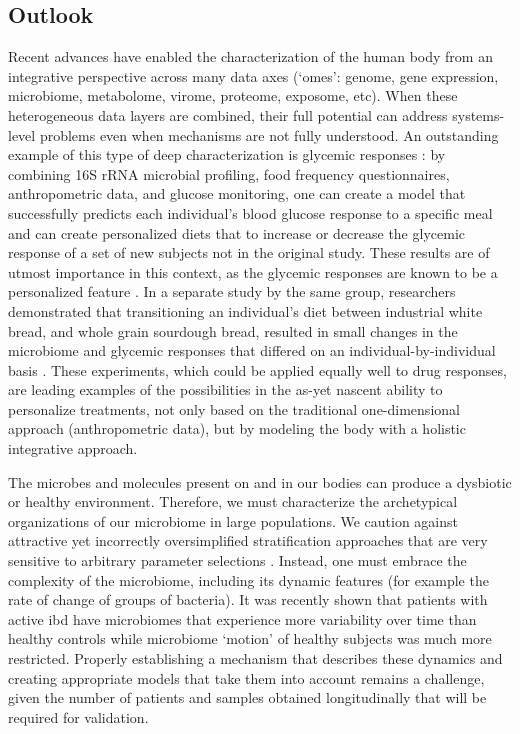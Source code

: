 \subsection{Outlook}
Recent advances have enabled the characterization of the human body from an integrative perspective across many data axes (`omes': genome, gene expression, microbiome, metabolome, virome, proteome, exposome, etc). When these heterogeneous data layers are combined, their full potential can address systems-level problems even when mechanisms are not fully understood. An outstanding example of this type of deep characterization is glycemic responses \cite{RN4181}:  by combining 16S rRNA microbial profiling, food frequency questionnaires, anthropometric data, and glucose monitoring, one can create a model that successfully predicts each individual's blood glucose response to a specific meal and can create personalized diets that to increase or decrease the glycemic response of a set of new subjects not in the original study. These results are of utmost importance in this context, as the glycemic responses are known to be a personalized feature \cite{RN4192, RN4191}. In a separate study by the same group, researchers demonstrated that transitioning an individual's diet between industrial white bread, and whole grain sourdough bread, resulted in small changes in the microbiome and glycemic responses that differed on an individual-by-individual basis \cite{RN4193}. These experiments, which could be applied equally well to drug responses, are leading examples of the possibilities in the as-yet nascent ability to personalize treatments, not only based on the traditional one-dimensional approach (anthropometric data), but by modeling the body with a holistic integrative approach.

The microbes and molecules present on and in our bodies can produce a dysbiotic or healthy environment. Therefore, we must characterize the archetypical organizations of our microbiome in large populations. We caution against attractive yet incorrectly oversimplified stratification approaches \cite{RN4194} that are very sensitive to arbitrary parameter selections \cite{RN4195, RN4196}. Instead, one must embrace the complexity of the microbiome, including its dynamic features (for example the rate of change of groups of bacteria). It was recently shown that patients with active \gls{ibd} have microbiomes that experience more variability over time than healthy controls \cite{RN4197} while microbiome `motion' of healthy subjects was much more restricted. Properly establishing a mechanism that describes these dynamics and creating appropriate models that take them into account remains a challenge, given the number of patients and samples obtained longitudinally that will be required for validation.

